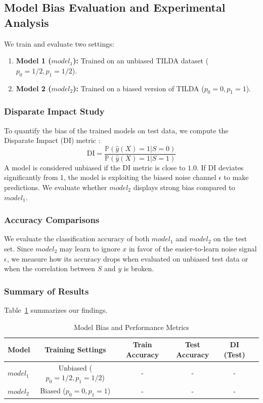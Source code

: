 \documentclass{name}
\begin{document}
\subsection{Model Bias Evaluation and Experimental Analysis}
We train and evaluate two settings:
\begin{enumerate}
    \item \textbf{Model 1 ($model_1$):} Trained on an unbiased TILDA dataset ($p_0 = 1/2, p_1 = 1/2$).
    \item \textbf{Model 2 ($model_2$):} Trained on a biased version of TILDA ($p_0 = 0, p_1 = 1$).
\end{enumerate}

\subsubsection{Disparate Impact Study}
To quantify the bias of the trained models on test data, we compute the Disparate Impact (DI) metric \cite{besse2022european}:
\begin{equation}
    \text{DI} = \frac{\mathbb{P}(\hat{y}(X) = 1 | S = 0)}{\mathbb{P}(\hat{y}(X) = 1 | S = 1)}
\end{equation}
A model is considered unbiased if the DI metric is close to $1.0$. If DI deviates significantly from 1, the model is exploiting the biased noise channel $\epsilon$ to make predictions. We evaluate whether $model_2$ displays strong bias compared to $model_1$.

\subsubsection{Accuracy Comparisons}
We evaluate the classification accuracy of both $model_1$ and $model_2$ on the test set. 
Since $model_2$ may learn to ignore $x$ in favor of the easier-to-learn noise signal $\epsilon$, we measure how its accuracy drops when evaluated on unbiased test data or when the correlation between $S$ and $y$ is broken.

\subsubsection{Summary of Results}
Table~\ref{tab:bias_evaluation_results} summarizes our findings.

\begin{table}[H]
\centering
\caption{Model Bias and Performance Metrics}
\label{tab:bias_evaluation_results}
\begin{tabular}{lccccc}
\toprule
Model & Training Settings & Train Accuracy & Test Accuracy & DI (Test) \\
\midrule
$model_1$ & Unbiased ($p_0=1/2, p_1=1/2$) & - & - & - \\
$model_2$ & Biased ($p_0=0, p_1=1$) & - & - & - \\
\bottomrule
\end{tabular}
\end{table}
\end{document}
